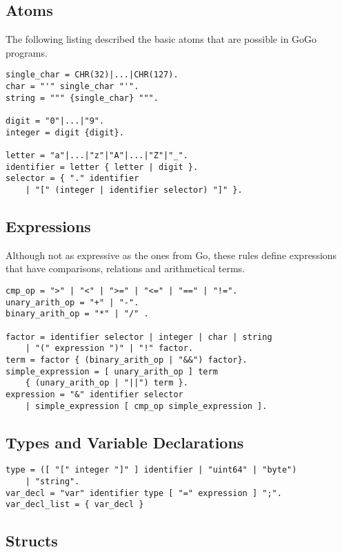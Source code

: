 \documentclass[a4paper]{scrreprt}
\begin{document}
      \subsection*{Atoms}
        The following listing described the basic atoms that are possible in GoGo programs.

        \begin{lstlisting}[caption=Atoms]
single_char = CHR(32)|...|CHR(127).
char = "'" single_char "'".
string = """ {single_char} """.

digit = "0"|...|"9".	
integer = digit {digit}.

letter = "a"|...|"z"|"A"|...|"Z"|"_".
identifier = letter { letter | digit }.
selector = { "." identifier 
    | "[" (integer | identifier selector) "]" }.
        \end{lstlisting}

      \subsection*{Expressions}
        Although not as expressive as the ones from Go, these rules define expressions that have comparisons, relations and arithmetical terms. 

        \begin{lstlisting}[caption=Expressions]
cmp_op = ">" | "<" | ">=" | "<=" | "==" | "!=".
unary_arith_op = "+" | "-".
binary_arith_op = "*" | "/" .

factor = identifier selector | integer | char | string 
    | "(" expression ")" | "!" factor.	
term = factor { (binary_arith_op | "&&") factor}.
simple_expression = [ unary_arith_op ] term 
    { (unary_arith_op | "||") term }.
expression = "&" identifier selector 
    | simple_expression [ cmp_op simple_expression ].
        \end{lstlisting}

      \subsection*{Types and Variable Declarations}

        \begin{lstlisting}[caption=Types]
type = ([ "[" integer "]" ] identifier | "uint64" | "byte") 
    | "string".
var_decl = "var" identifier type [ "=" expression ] ";".
var_decl_list = { var_decl }
        \end{lstlisting}

      \subsection*{Structs}
\end{document}
